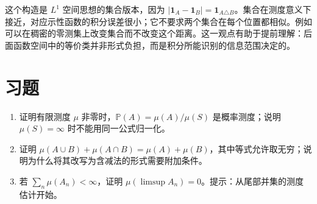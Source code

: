 这个构造是 $L^1$ 空间思想的集合版本，因为
$|\mathbf1_A-\mathbf1_B|=\mathbf1_{A\triangle B}$。集合在测度意义下接近，对应示性函数的积分误差很小；它不要求两个集合在每个位置都相似。例如可以在稠密的零测集上改变集合而不改变这个距离。这一观点有助于提前理解：后面函数空间中的等价类并非形式负担，而是积分所能识别的信息范围决定的。

\section{习题}
\begin{enumerate}
 \item 证明有限测度 $\mu$ 非零时，$\mathbb P(A)=\mu(A)/\mu(S)$ 是概率测度；说明 $\mu(S)=\infty$ 时不能用同一公式归一化。
 \item 证明 $\mu(A\cup B)+\mu(A\cap B)=\mu(A)+\mu(B)$，其中等式允许取无穷；说明为什么将其改写为含减法的形式需要附加条件。
 \item 若 $\sum_n\mu(A_n)<\infty$，证明 $\mu(\limsup A_n)=0$。提示：从尾部并集的测度估计开始。
\end{enumerate}

